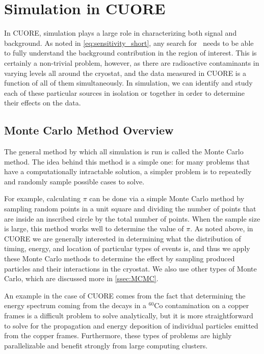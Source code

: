 \chapter{Simulation in CUORE}
\label{ch:Simulation in CUORE}

In CUORE, simulation plays a large role in characterizing both signal and background.
As noted in \autoref{eq:sensitivity_short}, any search for \zeronubb~needs to be able to fully understand the background contribution in the region of interest.
This is certainly a non-trivial problem, however, as there are radioactive contaminants in varying levels all around the cryostat, and the data measured in CUORE is a function of all of them simultaneously.
In simulation, we can identify and study each of these particular sources in isolation or together in order to determine their effects on the data.
\section{Monte Carlo Method Overview}
The general method by which all simulation is run is called the Monte Carlo method.
The idea behind this method is a simple one: for many problems that have a computationally intractable solution, a simpler problem is to repeatedly and randomly sample possible cases to solve.

For example, calculating $\pi$ can be done via a simple Monte Carlo method by sampling random points in a unit square and dividing the number of points that are inside an inscribed circle by the total number of points.
When the sample size is large, this method works well to determine the value of $\pi$.
As noted above, in CUORE we are generally interested in determining what the distribution of timing, energy, and location of particular types of events is, and thus we apply these Monte Carlo methods to determine the effect by sampling produced particles and their interactions in the cryostat.
We also use other types of Monte Carlo, which are discussed more in \autoref{ssec:MCMC}.

An example in the case of CUORE comes from the fact that determining the energy spectrum coming from the decays in a $^{60}\textrm{Co}$ contamination on a copper frames is a difficult problem to solve analytically, but it is more straightforward to solve for the propagation and energy deposition of individual particles emitted from the copper frames.
Furthermore, these types of problems are highly parallelizable and benefit strongly from large computing clusters.

